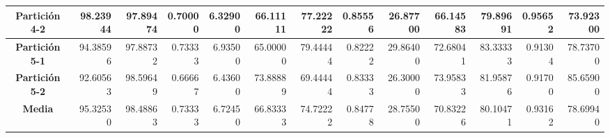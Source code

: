 \documentclass[a4paper,11pt]{article}
\begin{document}
\begin{table}[H]
\begin{adjustbox}{width=1.1\textwidth}
\begin{tabular}{|c|r|r|r|r|r|r|r|r|r|r|r|r|}
  \textbf{Partición 4-2} & 98.23944 & 97.89474 & 0.70000 & 6.32900 & 66.11111 & 77.22222 & 0.85556 & 26.87700 & 66.14583 & 79.89691 & 0.95652 & 73.92300 \\ \hline
  \textbf{Partición 5-1} & 94.38596 & 97.88732 & 0.73333 & 6.93500 & 65.00000 & 79.44444 & 0.82222 & 29.86400 & 72.68041 & 83.33333 & 0.91304 & 78.73700 \\ \hline
  \textbf{Partición 5-2} & 92.60563 & 98.59649 & 0.66667 & 6.43600 & 73.88889 & 69.44444 & 0.83333 & 26.30000 & 73.95833 & 81.95876 & 0.91700 & 85.65900 \\ \hline
  \textbf{Media} & 95.32530 & 98.48863 & 0.73333 & 6.72450 & 66.83333 & 74.72222 & 0.84778 & 28.75500 & 70.83226 & 80.10471 & 0.93162 & 78.69940 \\ \hline
  \end{tabular}
  \end{adjustbox}
  \label{}
  \end{table}
\end{document}
